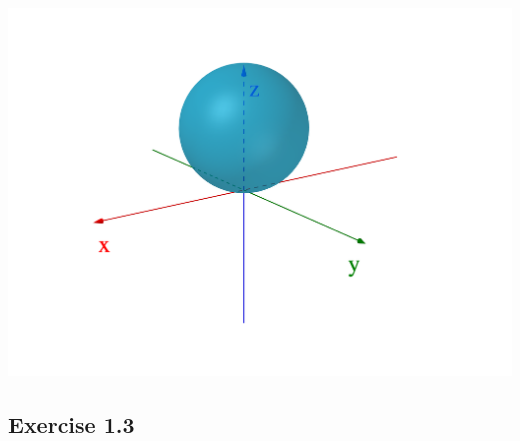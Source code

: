 \documentclass[11pt,fleqn]{book} %
\begin{document}
\begin{enumerate}
\begin{minipage}[c]{0.2\linewidth}
\begin{center}
        \end{center}
    \end{minipage}
    \begin{minipage}[c]{0.5\linewidth}
        \begin{center} \includegraphics[width=0.9\linewidth]{Plots/e_1_2/6.png} \end{center}
    \end{minipage}
\end{enumerate}

\subsection*{Exercise 1.3}
\end{document}
